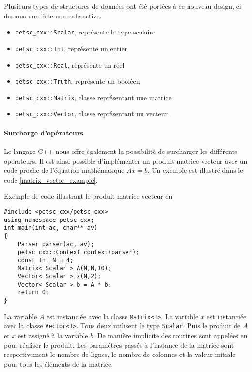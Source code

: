 Plusieurs types de structures de données ont été portées à ce nouveau design, ci-dessous une liste non-exhaustive.

\begin{itemize}
\item \verb#petsc_cxx::Scalar#, représente le type scalaire
\item \verb#petsc_cxx::Int#, représente un entier
\item \verb#petsc_cxx::Real#, représente un réel
\item \verb#petsc_cxx::Truth#, représente un booléen
\item \verb#petsc_cxx::Matrix#, classe représentant une matrice \petsc
\item \verb#petsc_cxx::Vector#, classe représentant un vecteur \petsc
\end{itemize}

\paragraph{Surcharge d'opérateurs}

Le langage C++ nous offre également la possibilité de surcharger les différents operateurs. Il est ainsi possible d'implémenter un produit matrice-vecteur avec un code proche de l'équation mathématique $Ax = b$. Un exemple est illustré dans le code \ref{matrix_vector_example}.

\begin{algorithm}[h]
  \caption{Exemple de code illustrant le produit matrice-vecteur en \petscx}
  \label{matrix_vector_example}
\begin{verbatim}
#include <petsc_cxx/petsc_cxx>
using namespace petsc_cxx;
int main(int ac, char** av)
{
    Parser parser(ac, av);
    petsc_cxx::Context context(parser);
    const Int N = 4;
    Matrix< Scalar > A(N,N,10);
    Vector< Scalar > x(N,2);
    Vector< Scalar > b = A * b;
    return 0;
}
\end{verbatim}
\end{algorithm}

La variable $A$ est instanciée avec la classe \verb#Matrix<T>#. La variable $x$ est instanciée avec la classe \verb#Vector<T>#. Tous deux utilisent le type \verb#Scalar#. Puis le produit de $A$ et $x$ est assigné à la variable $b$. De manière implicite des routines sont appelées en \petsc pour réaliser le produit. Les paramètres passés à l'instance de la matrice sont respectivement le nombre de lignes, le nombre de colonnes et la valeur initiale pour tous les éléments de la matrice.
